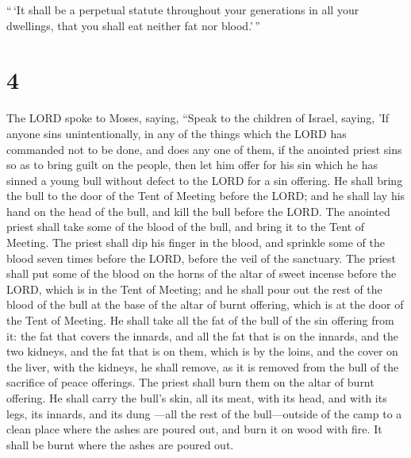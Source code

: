  ``\,`It shall be a perpetual statute throughout your
generations in all your dwellings, that you shall eat neither fat nor
blood.'\,''

\hypertarget{section-3}{%
\section{4}\label{section-3}}

 The LORD spoke to Moses, saying,  ``Speak to
the children of Israel, saying, 'If anyone sins unintentionally, in any
of the things which the LORD has commanded not to be done, and does any
one of them,  if the anointed priest sins so as to bring
guilt on the people, then let him offer for his sin which he has sinned
a young bull without defect to the LORD for a sin offering. 
He shall bring the bull to the door of the Tent of Meeting before the
LORD; and he shall lay his hand on the head of the bull, and kill the
bull before the LORD.  The anointed priest shall take some
of the blood of the bull, and bring it to the Tent of Meeting.
 The priest shall dip his finger in the blood, and sprinkle
some of the blood seven times before the LORD, before the veil of the
sanctuary.  The priest shall put some of the blood on the
horns of the altar of sweet incense before the LORD, which is in the
Tent of Meeting; and he shall pour out the rest of the blood of the bull
at the base of the altar of burnt offering, which is at the door of the
Tent of Meeting.  He shall take all the fat of the bull of
the sin offering from it: the fat that covers the innards, and all the
fat that is on the innards,  and the two kidneys, and the
fat that is on them, which is by the loins, and the cover on the liver,
with the kidneys, he shall remove,  as it is removed from
the bull of the sacrifice of peace offerings. The priest shall burn them
on the altar of burnt offering.  He shall carry the bull's
skin, all its meat, with its head, and with its legs, its innards, and
its dung  ---all the rest of the bull---outside of the camp
to a clean place where the ashes are poured out, and burn it on wood
with fire. It shall be burnt where the ashes are poured out.

